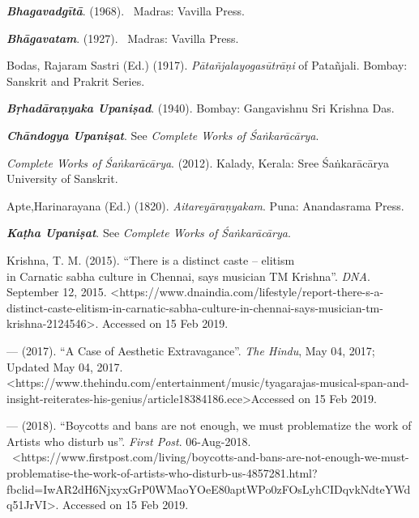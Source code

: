 \begin{thebibliography}{99}
\itemsep=1pt

  \textbf{\textit{Bhagavadgītā}}. (1968).  Madras: Vavilla Press.

  \textbf{\textit{Bhāgavatam}}. (1927).  Madras: Vavilla Press.

  Bodas, Rajaram Sastri (Ed.) (1917). \textit{Pātañjalayogasūtrāṇi} of Patañjali. Bombay: Sanskrit and Prakrit Series.

  \textbf{\textit{Bṛhadāraṇyaka Upaniṣad}}. (1940). Bombay: Gangavishnu Sri Krishna Das.

  \textbf{\textit{Chāndogya Upaniṣat}}. See \textit{Complete Works of Śaṅkarācārya}.

  \textit{Complete Works of Śaṅkarācārya}. (2012). Kalady, Kerala: Sree Śaṅkarācārya University of Sanskrit.

  Apte,Harinarayana (Ed.) (1820). \textit{Aitareyāraṇyakam}. Puna: Anandasrama Press.

  \textbf{\textit{Kaṭha Upaniṣat}}. See \textit{Complete Works of Śaṅkarācārya}.

  Krishna, T. M. (2015). “There is a distinct caste – elitism\\ in Carnatic sabha culture in Chennai, says musician TM Krishna”. \textit{DNA}. September 12, 2015. \textless  https://www.dnaindia.com/lifestyle/report-there-s-a-distinct-caste-elitism-in-carnatic-sabha-culture-in-chennai-says-musician-tm-krishna-2124546\textgreater . Accessed on 15 Feb 2019.

  — (2017). “A Case of Aesthetic Extravagance”. \textit{The Hindu}, May 04, 2017; Updated May 04, 2017. \textless https://www.thehindu.com/entertainment/\break music/tyagarajas-musical-span-and-insight-reiterates-his-genius/article18384186.ece\textgreater  Accessed on 15 Feb 2019.

  — (2018). “Boycotts and bans are not enough, we must problematize the work of Artists who disturb us”. \textit{First Post}. 06-Aug-2018.  \textless https://www.firstpost.com/living/boycotts-and-bans-are-not-enough-we-must-problematise-the-work-of-artists-who-disturb-us-4857281.html?fbclid=IwAR2dH6NjxyxGrP0WMaoYOeE80apt\break WPo0zFOsLyhCIDqvkNdteYWdq51JrVI\textgreater . Accessed on 15 Feb 2019.


\end{thebibliography}
